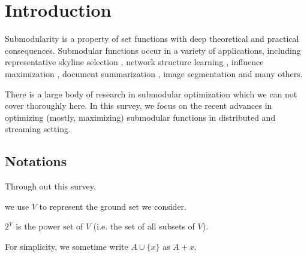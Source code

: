 \section{Introduction}
Submodularity is a property of set functions with deep theoretical and practical consequences. Submodular functions occur in a variety of applications, including representative skyline selection \cite{SLN+11}, network structure learning \cite{GLK10}, influence maximization \cite{KKT03}, document summarization \cite{LB11}, image segmentation \cite{BJM01,KKT09} and many others.


There is a large body of research in submodular optimization which we can not cover thoroughly here. In this survey, we focus on the recent advances in optimizing (mostly, maximizing) submodular functions in distributed and streaming setting.


\subsection{Notations}
Through out this survey, 

we use $V$ to represent the ground set we consider. 

$2^V$ is the power set of $V$ (i.e. the set of all subsets of $V$).

For simplicity, we sometime write $A \cup \{x\}$ as $A + x$.
